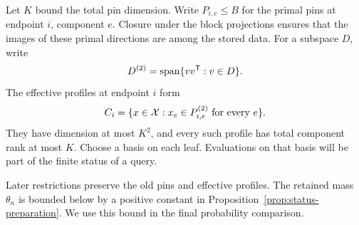 Let \(K\) bound the total pin dimension. Write \(P_{i,e}\le B\) for the
primal pins at endpoint \(i\), component \(e\). Closure under the block projections ensures that the images of these
primal directions are among the stored data.
For a subspace \(D\), write
\[
 D^{(2)}=\operatorname{span}\{vv^{\mathsf T}:v\in D\}.
\]
The effective profiles at endpoint \(i\) form
\begin{equation}\label{eq:effective-space}
 C_i=\{x\in\mathcal X:x_e\in P_{i,e}^{(2)}\text{ for every }e\}.
\end{equation}
They have dimension at most \(K^2\), and every such profile has total
component rank at most \(K\). Choose a basis on each leaf. Evaluations
on that basis will be part of the finite status of a query.

Later restrictions preserve the old pins and effective profiles. The
retained mass \(\theta_n\) is bounded below by a positive constant in
Proposition~\ref{prop:status-preparation}. We use this bound in the final probability
comparison.
